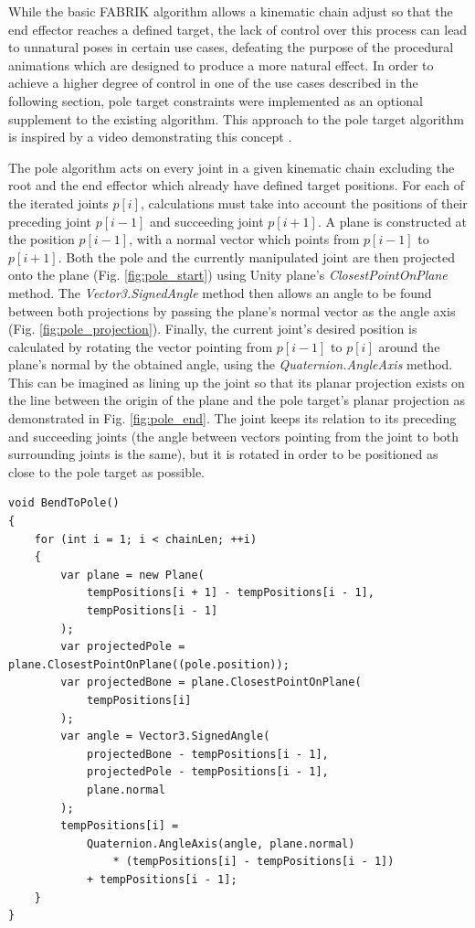 While the basic FABRIK algorithm allows a kinematic chain adjust so that the end
effector reaches a defined target, the lack of control over this process can
lead to unnatural poses in certain use cases, defeating the purpose of the
procedural animations which are designed to produce a more natural effect. In
order to achieve a higher degree of control in one of the use cases described in
the following section, pole target constraints were implemented as an optional
supplement to the existing algorithm. This approach to the pole target algorithm
is inspired by a video demonstrating this concept \cite{youtube_ik}. 

The pole algorithm acts on every joint in a given kinematic chain excluding the
root and the end effector which already have defined target positions. For each
of the iterated joints \(p[i]\), calculations must take into account the
positions of their preceding joint \(p[i-1]\) and succeeding joint \(p[i+1]\).
A plane is constructed at the position \(p[i-1]\), with a normal vector which
points from \(p[i-1]\) to \(p[i+1]\). Both the pole and the currently
manipulated joint are then projected onto the plane (Fig.
\ref{fig:pole_start}) using Unity plane's \textit{ClosestPointOnPlane} method.
The \textit{Vector3.SignedAngle} method then allows an angle to be found between
both projections by passing the plane's normal vector as the angle axis (Fig.
\ref{fig:pole_projection}). Finally, the current joint's desired position is
calculated by rotating the vector pointing from \(p[i-1]\) to \(p[i]\) around
the plane's normal by the obtained angle, using the
\textit{Quaternion.AngleAxis} method. This can be imagined as lining up the
joint so that its planar projection exists on the line between the origin of the
plane and the pole target's planar projection as demonstrated in Fig.
\ref{fig:pole_end}. The joint keeps its relation to its preceding and succeeding
joints (the angle between vectors pointing from the joint to both surrounding
joints is the same), but it is rotated in order to be positioned as close to the
pole target as possible.

\begin{lstlisting}[basicstyle=\footnotesize, numbers=none,frame=single,
caption={Pole target constraint. \textit{Fabrik.cs}},captionpos=b, label=poles, language={[Sharp]c},
float=tp]
void BendToPole()
{
    for (int i = 1; i < chainLen; ++i)
    {
        var plane = new Plane(
            tempPositions[i + 1] - tempPositions[i - 1],
            tempPositions[i - 1]
        );
        var projectedPole = plane.ClosestPointOnPlane((pole.position));
        var projectedBone = plane.ClosestPointOnPlane(
            tempPositions[i]
        );
        var angle = Vector3.SignedAngle(
            projectedBone - tempPositions[i - 1],
            projectedPole - tempPositions[i - 1],
            plane.normal
        );
        tempPositions[i] =
            Quaternion.AngleAxis(angle, plane.normal)
                * (tempPositions[i] - tempPositions[i - 1])
            + tempPositions[i - 1];
    }
}
\end{lstlisting}


